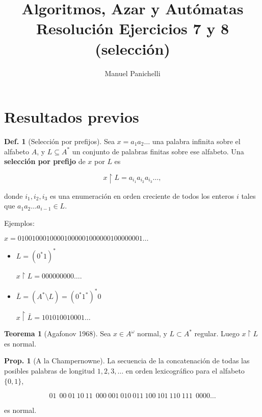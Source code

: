 \documentclass{article}
\author{Manuel Panichelli}
\title{Algoritmos, Azar y Autómatas\\Resolución Ejercicios 7 y 8 (selección)}
\theoremstyle{definition} %
\newtheorem{theorem}{Teorema}
\newtheorem{proposition}{Prop.}
\newtheorem{definition}{Def.}
\newcommand{\select}{\upharpoonright}
\begin{document}
\maketitle

\section*{Resultados previos}

\begin{definition}[Selección por prefijos]\label{def:prefix-selection}
    Sea $x = a_1 a_2 \dots$ una palabra infinita sobre el alfabeto $A$, y $L
    \subseteq A^*$ un conjunto de palabras finitas sobre ese alfabeto. Una
    \textbf{selección por prefijo} de $x$ por $L$ es

    $$x \select L = a_{i_1} a_{i_2} a_{i_3} \dots,$$

    donde $i_1, i_2, i_3$ es una enumeración en orden creciente de todos los
    enteros $i$ tales que $a_1 a_2 \dots a_{i - 1} \in L$.

    Ejemplos:

    $x = 01001000100001000001000000100000001\dots$
    \begin{itemize}
        \item $L = (0^* 1)^*$

        $x \select L = 000000000\dots$.

        \item $\bar{L} = (A^* \setminus L) = (0^* 1^*)^* 0$
        
        $x \select \bar{L} = 101010010001\dots$
    \end{itemize}
\end{definition}

\begin{theorem}[Agafonov 1968]\label{teo:norm-select-regular}
    Sea $x \in A^\omega$ normal, y $L \subset A^*$ regular. Luego $x \select L$
    es normal.
\end{theorem}

\begin{proposition}[A la Champernowne]\label{prop:a-la-champ}
    La secuencia de la concatenación de todas las posibles palabras de longitud
    $1, 2, 3, \dots$ en orden lexicográfico para el alfabeto $\{0, 1\}$,

    \[
        01\ \
        00\ 01\ 10\ 11\ \
        000\ 001\ 010\ 011\ 100\ 101\ 110\ 111\ \
        0000\dots
    \]

    es normal.
\end{proposition}
\end{document}
